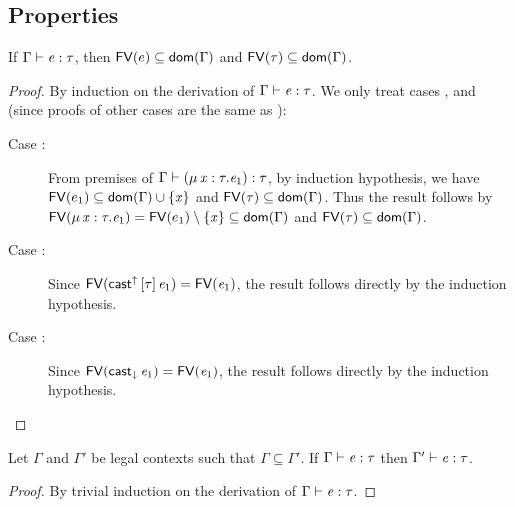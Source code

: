\subsection{Properties}
\begin{lem}\label{lem:appendix:free}
    If $\Gamma  \vdash  \mathit{e}  :  \tau$, then $\mathsf{FV}(e) \subseteq \mathsf{dom}(\Gamma)$ and $\mathsf{FV}(\tau) \subseteq \mathsf{dom}(\Gamma)$.
\end{lem}

\begin{proof}
    By induction on the derivation of $\Gamma  \vdash  \mathit{e}  :  \tau$. We only treat cases ,  and  (since proofs of other cases are the same as \cc \cite{handbook}):
    \begin{description}
        \item[Case :] From premises of $\Gamma  \vdash  (  \mu \, \mathit{x}  :  \tau  .  \mathit{e_{{\mathrm{1}}}}  )  :  \tau$, by induction hypothesis, we have $\mathsf{FV}(e_1) \subseteq \mathsf{dom}(\Gamma) \cup \{\mathit{x}\}$ and $\mathsf{FV}(\tau) \subseteq \mathsf{dom}(\Gamma)$. Thus the result follows by $\mathsf{FV}(\mu \, \mathit{x}  :  \tau  .  \mathit{e_{{\mathrm{1}}}})=\mathsf{FV}(e_1) \setminus \{\mathit{x}\} \subseteq \mathsf{dom}(\Gamma)$ and $\mathsf{FV}(\tau) \subseteq \mathsf{dom}(\Gamma)$.
        \item[Case :] Since $\mathsf{FV}(\mathsf{cast}^{\uparrow} \, [  \tau  ] \,  \mathit{e_{{\mathrm{1}}}})=\mathsf{FV}(\mathit{e_{{\mathrm{1}}}})$, the result follows directly by the induction hypothesis.
        \item[Case :] Since $\mathsf{FV}(\mathsf{cast}_{\downarrow} \, \mathit{e_{{\mathrm{1}}}})=\mathsf{FV}(\mathit{e_{{\mathrm{1}}}})$, the result follows directly by the induction hypothesis.
    \end{description}
\end{proof}

\begin{lem}\label{lem:appendix:thin}
    Let $\Gamma$ and $\Gamma'$ be legal contexts such that $\Gamma \subseteq \Gamma'$. If $\Gamma  \vdash  \mathit{e}  :  \tau$ then $\Gamma'  \vdash  \mathit{e}  :  \tau$.
\end{lem}

\begin{proof}
    By trivial induction on the derivation of $\Gamma  \vdash  \mathit{e}  :  \tau$.
\end{proof}


